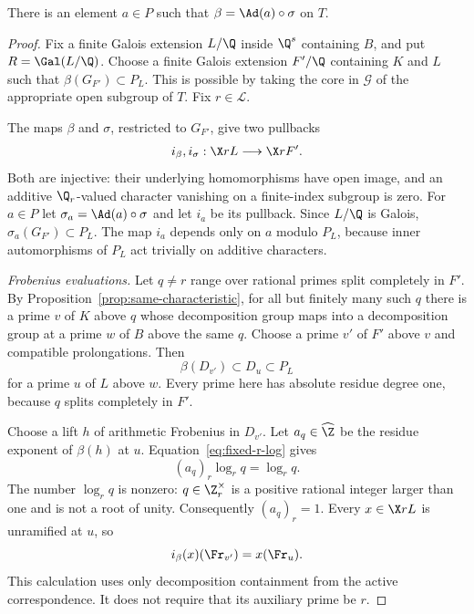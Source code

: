 \begin{proposition}\label{prop:identify-normalized}
There is an element $a\in P$ such that $\beta=\Ad(a)\circ\sigma$ on $T$.
\end{proposition}
\begin{proof}
Fix a finite Galois extension $L/\Q$ inside $\Q^s$ containing $B$, and put $R=\Gal(L/\Q)$. Choose a finite Galois extension $F'/\Q$ containing $K$ and $L$ such that $\beta(G_{F'})\subset P_L$. This is possible by taking the core in $\mathcal G$ of the appropriate open subgroup of $T$. Fix $r\in\mathcal L$.

The maps $\beta$ and $\sigma$, restricted to $G_{F'}$, give two pullbacks
\begin{equation}\label{eq:two-pullbacks}
 i_\beta,i_\sigma:\X rL\longrightarrow\X r{F'}.
\end{equation}
Both are injective: their underlying homomorphisms have open image, and an additive $\Q_r$-valued character vanishing on a finite-index subgroup is zero. For $a\in P$ let $\sigma_a=\Ad(a)\circ\sigma$ and let $i_a$ be its pullback. Since $L/\Q$ is Galois, $\sigma_a(G_{F'})\subset P_L$. The map $i_a$ depends only on $a$ modulo $P_L$, because inner automorphisms of $P_L$ act trivially on additive characters.

\emph{Frobenius evaluations.}
Let $q\ne r$ range over rational primes split completely in $F'$. By Proposition~\ref{prop:same-characteristic}, for all but finitely many such $q$ there is a prime $v$ of $K$ above $q$ whose decomposition group maps into a decomposition group at a prime $w$ of $B$ above the same $q$. Choose a prime $v'$ of $F'$ above $v$ and compatible prolongations. Then
\[
 \beta(D_{v'})\subset D_u\subset P_L
\]
for a prime $u$ of $L$ above $w$. Every prime here has absolute residue degree one, because $q$ splits completely in $F'$.

Choose a lift $h$ of arithmetic Frobenius in $D_{v'}$. Let $a_q\in\widehat{\Z}$ be the residue exponent of $\beta(h)$ at $u$. Equation~\eqref{eq:fixed-r-log} gives
\[
 (a_q)_r\log_r q=\log_r q.
\]
The number $\log_r q$ is nonzero: $q\in\Z_r^\times$ is a positive rational integer larger than one and is not a root of unity. Consequently $(a_q)_r=1$. Every $x\in\X rL$ is unramified at $u$, so
\begin{equation}\label{eq:matched-evaluation}
 i_\beta(x)(\Fr_{v'})=x(\Fr_u).
\end{equation}
This calculation uses only decomposition containment from the active correspondence. It does not require that its auxiliary prime be $r$.


\end{proof}
